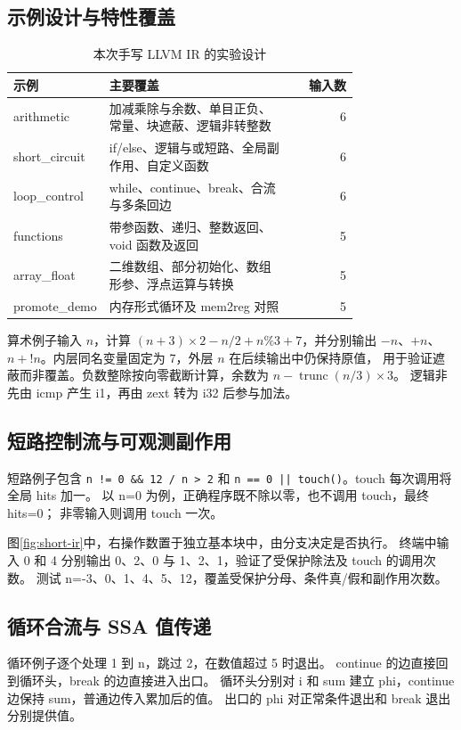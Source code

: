 \subsection{示例设计与特性覆盖}

\begin{table}[htbp]
\centering\small
\caption{本次手写 LLVM IR 的实验设计}
\begin{tabular}{p{0.23\linewidth}p{0.54\linewidth}r}
\toprule
示例 & 主要覆盖 & 输入数\\
\midrule
arithmetic & 加减乘除与余数、单目正负、常量、块遮蔽、逻辑非转整数 & 6\\
short\_circuit & if/else、逻辑与或短路、全局副作用、自定义函数 & 6\\
loop\_control & while、continue、break、合流与多条回边 & 6\\
functions & 带参函数、递归、整数返回、void 函数及返回 & 5\\
array\_float & 二维数组、部分初始化、数组形参、浮点运算与转换 & 5\\
promote\_demo & 内存形式循环及 mem2reg 对照 & 5\\
\bottomrule
\end{tabular}
\end{table}

算术例子输入 $n$，计算 $(n+3)\times2-n/2+n\%3+7$，并分别输出
$-n$、$+n$、$n+!n$。内层同名变量固定为 7，外层 $n$ 在后续输出中仍保持原值，
用于验证遮蔽而非覆盖。负数整除按向零截断计算，余数为
$n-\operatorname{trunc}(n/3)\times3$。
逻辑非先由 icmp 产生 i1，再由 zext 转为 i32 后参与加法。

\subsection{短路控制流与可观测副作用}
短路例子包含 \texttt{n != 0 \&\& 12 / n > 2} 和
\texttt{n == 0 || touch()}。touch 每次调用将全局 hits 加一。
以 n=0 为例，正确程序既不除以零，也不调用 touch，最终 hits=0；
非零输入则调用 touch 一次。



图\ref{fig:short-ir}中，右操作数置于独立基本块中，由分支决定是否执行。
终端中输入 0 和 4 分别输出 0、2、0 与 1、2、1，验证了受保护除法及 touch 的调用次数。
测试 n=-3、0、1、4、5、12，覆盖受保护分母、条件真/假和副作用次数。

\subsection{循环合流与 SSA 值传递}
循环例子逐个处理 1 到 n，跳过 2，在数值超过 5 时退出。
continue 的边直接回到循环头，break 的边直接进入出口。
循环头分别对 i 和 sum 建立 phi，continue 边保持 sum，普通边传入累加后的值。
出口的 phi 对正常条件退出和 break 退出分别提供值。

